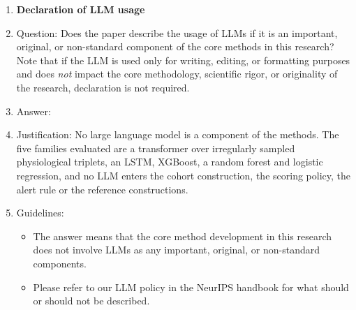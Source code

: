 \begin{enumerate}
\item {\bf Declaration of LLM usage}
    \item[] Question: Does the paper describe the usage of LLMs if it is an important, original, or non-standard component of the core methods in this research? Note that if the LLM is used only for writing, editing, or formatting purposes and does \emph{not} impact the core methodology, scientific rigor, or originality of the research, declaration is not required.
    \item[] Answer: \answerNA{}
    \item[] Justification: No large language model is a component of the methods. The five families evaluated are a transformer over irregularly sampled physiological triplets, an LSTM, XGBoost, a random forest and logistic regression, and no LLM enters the cohort construction, the scoring policy, the alert rule or the reference constructions.
    \item[] Guidelines:
    \begin{itemize}
        \item The answer \answerNA{} means that the core method development in this research does not involve LLMs as any important, original, or non-standard components.
        \item Please refer to our LLM policy in the NeurIPS handbook for what should or should not be described.
    \end{itemize}

\end{enumerate}